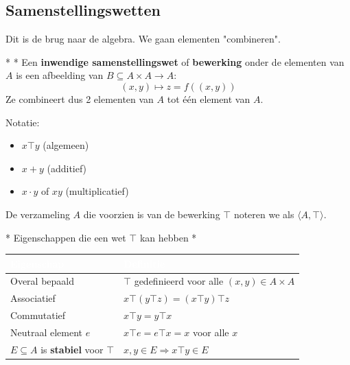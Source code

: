 \subsection{Samenstellingswetten}

Dit is de brug naar de algebra. We gaan elementen "combineren".

\begin{nicedefinition}*\label{def:inwendige_samenstellingswet}
    \nextpart[]*
    Een \textcolor{PineGreen!75!black}{\textbf{inwendige samenstellingswet}} of \textcolor{PineGreen!75!black}{\textbf{bewerking}} onder de elementen van $A$ is een afbeelding van $B \subseteq A \times A \to A:$
    \begin{equation*}
        (x,y) \mapsto z = f((x,y))
    \end{equation*}
    Ze combineert dus 2 elementen van $A$ tot één element van $A$.

    \vspace{0.25cm}

    Notatie:
    \begin{itemize}
        \item $x \top y$ (algemeen)
        \item $x + y$ (additief)
        \item $x \cdot y$ of $xy$ (multiplicatief)
    \end{itemize}
    De verzameling $A$ die voorzien is van de bewerking $\top$ noteren we als $\langle A, \top \rangle$.
\end{nicedefinition}

\begin{niceproperty}*
    Eigenschappen die een wet $\top$ kan hebben
    \nextpart[]*
    \begin{center}
        \renewcommand{\arraystretch}{1.5}
        \setlength{\arrayrulewidth}{1pt}
        \begin{tabularx}{\linewidth}{@{} | >{\hsize}L | >{\hsize}L | @{}}
            \hline
            \textcolor{white}{\textbf{Eigenschap}} & \textcolor{white}{\textbf{Definitie}} \\
            \hline
             Overal bepaald & $\top$ gedefinieerd voor alle $(x,y) \in A \times A$ \\
            \hline
             Associatief & $x \top (y \top z) = (x \top y) \top z$ \\
            \hline
             Commutatief & $x \top y = y \top x$ \\
            \hline
             Neutraal element $e$ & $x \top e = e \top x = x$ voor alle $x$ \\
            \hline
             $E \subseteq A$ is \textbf{stabiel} voor $\top$ & $x, y \in E \Rightarrow x \top y \in E$ \\
            \hline
        \end{tabularx}
    \end{center}
\end{niceproperty}

